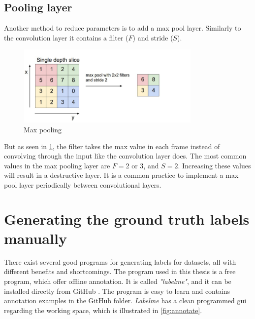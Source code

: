 \documentclass[USenglish]{ifimaster}  %
\begin{document}
\subsection{Pooling layer}
Another method to reduce parameters is to add a max pool layer. Similarly to the convolution layer it contains a filter ($F$) and stride ($S$). 

\begin{figure}[ht]
    \centering
    \includegraphics[width=0.8\textwidth]{bilder/max_pooling.png}
    \caption{Max pooling \cite{website:cs231n}}
    \label{fig:max_pooling}
\end{figure}

But as seen in \cref{fig:max_pooling}, the filter takes the max value in each frame instead of convolving through the input like the convolution layer does. The most common values in the max pooling layer are $F=$2 or 3, and $S=2$. Increasing these values will result in a destructive layer. It is a common practice to implement a max pool layer periodically between convolutional layers.

\section{Generating the ground truth labels manually}
There exist several good programs for generating labels for datasets, all with different benefits and shortcomings. The program used in this thesis is a free program, which offer offline annotation. It is called \textit{"labelme"}, and it can be installed directly from GitHub \cite{website:labelme}. The program is easy to learn and contains annotation examples in the GitHub folder. \textit{Labelme} has a clean programmed \ac{gui} regarding the working space, which is illustrated in \cref{fig:annotate}. 
\end{document}
